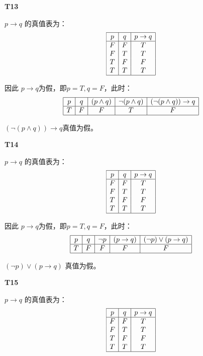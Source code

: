 \documentclass{article}
\begin{document}
\vspace{10pt}

\textbf{T13}

$p \rightarrow q$ 的真值表为：\[
\begin{array}{|c|c|c|}
    \hline
    p & q & p \rightarrow q\\
    \hline
    F & F & T\\
    F & T & T\\
    T & F & F\\
    T & T & T\\
    \hline    
\end{array}
\]

因此 $p \rightarrow q$为假，即$p = T, q = F$，此时：
\[
\begin{array}{|c|c|c|c|c|}
    \hline
    p & q & (p \land q) & \lnot (p \land q) & (\lnot (p \land q)) \rightarrow q\\
    \hline
    T & F & F & T & F\\
    \hline
\end{array}
\]

$(\lnot (p \land q)) \rightarrow q$真值为假。

\vspace{10pt}

\textbf{T14}

$p \rightarrow q$ 的真值表为：\[
\begin{array}{|c|c|c|}
    \hline
    p & q & p \rightarrow q\\
    \hline
    F & F & T\\
    F & T & T\\
    T & F & F\\
    T & T & T\\
    \hline    
\end{array}
\]

因此 $p \rightarrow q$为假，即$p = T, q = F$，此时：
\[
\begin{array}{|c|c|c|c|c|}
    \hline
    p & q & \lnot p & (p \rightarrow q) & (\lnot p) \lor (p \rightarrow q)\\
    \hline
    T & F & F & F & F\\
    \hline
\end{array}
\]

$(\lnot p) \lor (p \rightarrow q)$ 真值为假。

\vspace{10pt}

\textbf{T15}

$p \rightarrow q$ 的真值表为：\[
\begin{array}{|c|c|c|}
    \hline
    p & q & p \rightarrow q\\
    \hline
    F & F & T\\
    F & T & T\\
    T & F & F\\
    T & T & T\\
    \hline    
\end{array}
\]
\end{document}
